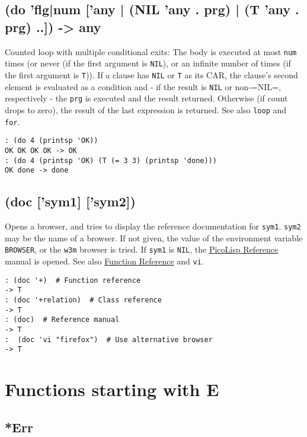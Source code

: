 {{{ 
\section{(do 'flg|num ['any | (NIL 'any . prg) | (T 'any . prg) ..]) -> any}
\label{sec-8-1-4-36}


Counted loop with multiple conditional exits: The body is executed at
most \texttt{num} times (or never (if the first argument is \texttt{NIL}), or an
infinite number of times (if the first argument is \texttt{T})). If a clause
has \texttt{NIL} or \texttt{T} as its CAR, the clause's second element is evaluated as
a condition and - if the result is \texttt{NIL} or non-=NIL=, respectively -
the \texttt{prg} is executed and the result returned. Otherwise (if count drops
to zero), the result of the last expression is returned. See also \texttt{loop}
and \texttt{for}.


\begin{verbatim}
: (do 4 (printsp 'OK))
OK OK OK OK -> OK
: (do 4 (printsp 'OK) (T (= 3 3) (printsp 'done)))
OK done -> done
\end{verbatim}

 
\section{(doc ['sym1] ['sym2])}
\label{sec-8-1-4-37}


Opens a browser, and tries to display the reference documentation for
\texttt{sym1}. \texttt{sym2} may be the name of a browser. If not given, the value of
the environment variable \texttt{BROWSER}, or the \texttt{w3m} browser is tried. If
\texttt{sym1} is \texttt{NIL}, the \hyperref[ref.html]{PicoLisp Reference} manual is opened.
See also \hyperref[ref.html-fun]{Function Reference} and \texttt{vi}.


\begin{verbatim}
: (doc '+)  # Function reference
-> T
: (doc '+relation)  # Class reference
-> T
: (doc)  # Reference manual
-> T
:  (doc 'vi "firefox")  # Use alternative browser
-> T
\end{verbatim}


\chapter{Functions starting with E}
\label{sec-8-1-5}


 
\section{*Err}
\label{sec-8-1-5-1}


}}}
